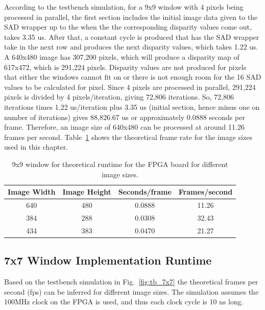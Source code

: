 According to the testbench simulation, for a 9x9 window with 4 pixels being processed in parallel, the first section includes the initial image data given to the SAD wrapper up to the when the the corresponding disparity values come out, takes 3.35 us. After that, a constant cycle is produced that has the SAD wrapper take in the next row and produces the next disparity values, which takes 1.22 us. A 640x480 image has 307,200 pixels, which will produce a disparity map of 617x472, which is 291,224 pixels. Disparity values are not produced for pixels that either the windows cannot fit on or there is not enough room for the 16 SAD values to be calculated for pixel. Since 4 pixels are processed in parallel, 291,224 pixels is divided by 4 pixels/iteration, giving 72,806 iterations. So, 72,806 iterations times 1.22 us/iteration plus 3.35 us (initial section, hence minus one on number of iterations) gives 88,826.67 us or approximately 0.0888 seconds per frame. Therefore, an image size of 640x480 can be processed at around 11.26 frames per second. Table~\ref{table:tb_9x9} shows the theoretical frame rate for the image sizes used in this chapter.

\begin{table}
	\begin{center}
		\begin{tabular}{|c|c|c|c|}
			\hline 
				\rowstyle{\bfseries} Image Width & 
				\rowstyle{\bfseries} Image Height & 
				\rowstyle{\bfseries} Seconds/frame & 
				\rowstyle{\bfseries} Frames/second
			\tabularnewline
			\hline 
			640 & 480 & 0.0888 & 11.26
			\tabularnewline
			\hline 
			384 & 288 & 0.0308 & 32.43
			\tabularnewline
			\hline 
			434 & 383 & 0.0470 & 21.27
			\tabularnewline
			\hline 			
			\end{tabular}
		\captionfonts
		\caption{9x9 window for theoretical runtime for the FPGA board for different image sizes.}
		\label{table:tb_9x9}
	\end{center}
\end{table}

\subsection{7x7 Window Implementation Runtime}
\label{sec:testbench7x7}

Based on the testbench simulation in Fig.~\ref{fig:tb_7x7} the theoretical frames per second (fps) can be inferred for different image sizes. The simulation assumes the 100MHz clock on the FPGA is used, and thus each clock cycle is 10 ns long.

